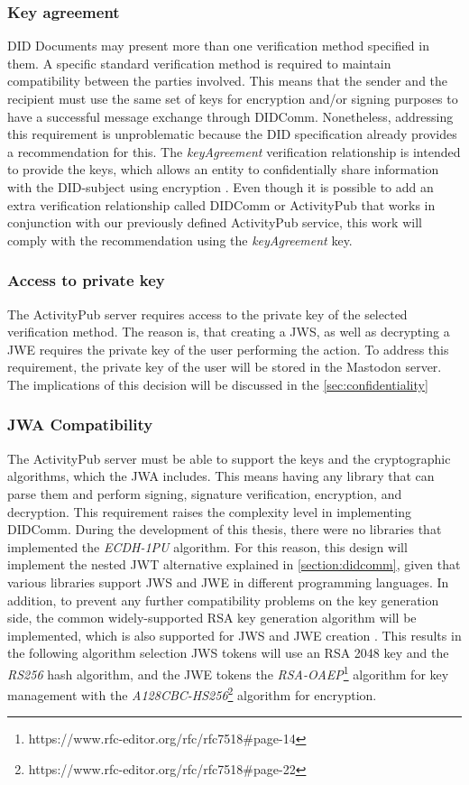\subsubsection*{\textbf{Key agreement}}
DID Documents may present more than one verification method specified in them. A specific standard verification method is required to maintain compatibility between the parties involved. This means that the sender and the recipient must use the same set of keys for encryption and/or signing purposes to have a successful message exchange through DIDComm. 
Nonetheless, addressing this requirement is unproblematic because the DID specification already provides a recommendation for this. The \emph{keyAgreement} verification relationship is intended to provide the keys, which allows an entity to confidentially share information with the DID-subject using encryption \cite{sporny_longley_sabadello_reed_steele_2021}. Even though it is possible to add an extra verification relationship called DIDComm or ActivityPub that works in conjunction with our previously defined ActivityPub service, this work will comply with the recommendation using the \emph{keyAgreement} key.

\subsubsection*{\textbf{Access to private key}}
The ActivityPub server requires access to the private key of the selected verification method. The reason is, that creating a JWS, as well as decrypting a JWE requires the private key of the user performing the action. To address this requirement, the private key of the user will be stored in the Mastodon server. The implications of this decision will be discussed in the \ref{sec:confidentiality}

\subsubsection*{\textbf{JWA Compatibility}}
The ActivityPub server must be able to support the keys and the cryptographic algorithms, which the JWA includes. This means having any library that can parse them and perform signing, signature verification,  encryption, and decryption. 
This requirement raises the complexity level in implementing DIDComm. During the development of this thesis, there were no libraries that implemented the \emph{ECDH-1PU} algorithm. For this reason, this design will implement the nested JWT alternative explained in \autoref{section:didcomm}, given that various libraries support JWS and JWE in different programming languages. In addition, to prevent any further compatibility problems on the key generation side, the common widely-supported RSA key generation algorithm will be implemented, which is also supported for JWS and JWE creation \cite{jones_2_2015}. This results in the following algorithm selection JWS tokens will use an RSA 2048 key and the \emph{RS256} hash algorithm, and the JWE tokens the \emph{RSA-OAEP}\footnote{https://www.rfc-editor.org/rfc/rfc7518\#page-14} algorithm for key management with the \emph{A128CBC-HS256}\footnote{https://www.rfc-editor.org/rfc/rfc7518\#page-22} algorithm for encryption.


